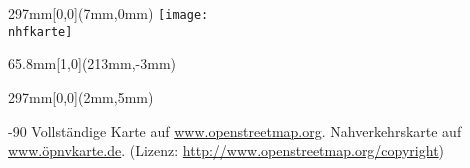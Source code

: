 \documentclass[a4paper]{memoir}
\begin{document}
\pagestyle{empty}


\null
\newpage

\impressum{\redaktionsschluss}
\null
\newpage

\pagestyle{empty}

\begin{textblock*}{297mm}[0,0](7mm,0mm)
    \texttt{[image: \\nhfkarte]}
\end{textblock*}

\begin{textblock*}{65.8mm}[1,0](213mm,-3mm)
    \setlength\fboxsep{0pt}
    \setlength\fboxrule{0.4mm}
\end{textblock*}


\begin{textblock*}{297mm}[0,0](2mm,5mm)
    \begin{turn}{-90}
        Vollständige Karte auf \url{www.openstreetmap.org}.
        Nahverkehrskarte auf \url{www.öpnvkarte.de}.
		(Lizenz: \url{http://www.openstreetmap.org/copyright})
    \end{turn}
\end{textblock*}
\null
\newpage
\end{document}
